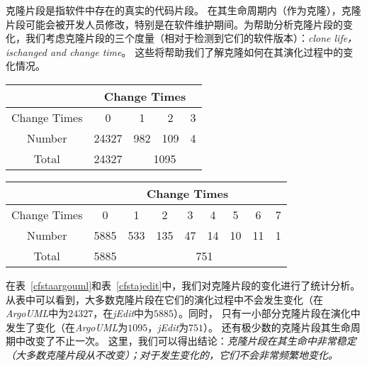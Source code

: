 克隆片段是指软件中存在的真实的代码片段。 在其生命周期内（作为克隆），克隆片段可能会被开发人员修改，特别是在软件维护期间。为帮助分析克隆片段的变化，我们考虑克隆片段的三个度量（相对于检测到它们的软件版本）：{\em clone life，ischanged and change time}。 这些将帮助我们了解克隆如何在其演化过程中的变化情况。

\begin{table}[htbp]
\vspace{0.5em}\centering\wuhao
\begin{tabular}{ccccc}
\toprule[1.5pt]
 & \multicolumn{4}{c}{Change Times}\\
\midrule[1pt]
Change Times&0&1&2&3\\ 
Number&24327&982&109&4\\ 
Total&24327&\multicolumn{3}{c}{1095} \\
\bottomrule[1.5pt]
\end{tabular}
\end{table}

\begin{table}[htbp]
\vspace{0.5em}\centering\wuhao
\begin{tabular}{ccccccccc}
\toprule[1.5pt]
 & \multicolumn{8}{c}{Change Times}\\
\midrule[1pt]
Change Times &0&1&2&3&4&5&6&7\\ 
Number&5885&533&135&47&14&10&11&1\\ 
Total&5885&\multicolumn{7}{c}{751}   \\ 
\bottomrule[1.5pt]
\end{tabular}
\end{table}

在表~\ref{cfstaargouml}和表~\ref{cfstajedit}中，我们对克隆片段的变化进行了统计分析。从表中可以看到，大多数克隆片段在它们的演化过程中不会发生变化（在{\em ArgoUML}中为$24327$，在{\em jEdit}中为$5885$）。同时， 只有一小部分克隆片段在演化中发生了变化（在{\em ArgoUML}为$1095$，{\em jEdit}为$751$）。 还有极少数的克隆片段其生命周期中改变了不止一次。 这里，我们可以得出结论：{\em 克隆片段在其生命中非常稳定（大多数克隆片段从不改变）；对于发生变化的，它们不会非常频繁地变化。}


